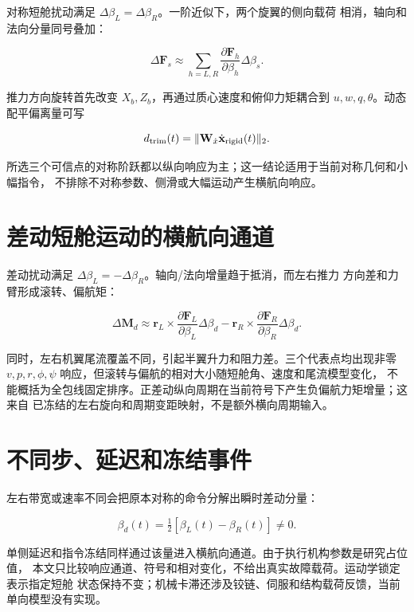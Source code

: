 \documentclass[UTF8,12pt,oneside,openany,fontset=windows]{ctexbook}
\begin{document}
对称短舱扰动满足 \(\Delta\beta_L=\Delta\beta_R\)。一阶近似下，两个旋翼的侧向载荷 相消，轴向和法向分量同号叠加：

\begin{equation}
\Delta\mathbf F_s\approx
\sum_{h=L,R}\frac{\partial\mathbf F_h}{\partial\beta_h}\Delta\beta_s .
\end{equation}

推力方向旋转首先改变 \(X_b,Z_b\)，再通过质心速度和俯仰力矩耦合到 \(u,w,q,\theta\)。动态配平偏离量可写

\begin{equation}
d_{\rm trim}(t)=
\|\mathbf W_{\dot x}\dot{\mathbf x}_{\rm rigid}(t)\|_2 .
\end{equation}

所选三个可信点的对称阶跃都以纵向响应为主；这一结论适用于当前对称几何和小幅指令， 不排除不对称参数、侧滑或大幅运动产生横航向响应。

\section{差动短舱运动的横航向通道}

差动扰动满足 \(\Delta\beta_L=-\Delta\beta_R\)。轴向/法向增量趋于抵消，而左右推力 方向差和力臂形成滚转、偏航矩：

\begin{equation}
\Delta\mathbf M_d\approx
\mathbf r_L\times\frac{\partial\mathbf F_L}{\partial\beta_L}\Delta\beta_d
-\mathbf r_R\times\frac{\partial\mathbf F_R}{\partial\beta_R}\Delta\beta_d .
\end{equation}

同时，左右机翼尾流覆盖不同，引起半翼升力和阻力差。三个代表点均出现非零 \(v,p,r,\phi,\psi\) 响应，但滚转与偏航的相对大小随短舱角、速度和尾流模型变化， 不能概括为全包线固定排序。正差动纵向周期在当前符号下产生负偏航力矩增量；这来自 已冻结的左右旋向和周期变距映射，不是额外横向周期输入。

\section{不同步、延迟和冻结事件}

左右带宽或速率不同会把原本对称的命令分解出瞬时差动分量：

\begin{equation}
\beta_d(t)=\tfrac12[\beta_L(t)-\beta_R(t)]\ne0.
\end{equation}

单侧延迟和指令冻结同样通过该量进入横航向通道。由于执行机构参数是研究占位值， 本文只比较响应通道、符号和相对变化，不给出真实故障载荷。运动学锁定表示指定短舱 状态保持不变；机械卡滞还涉及铰链、伺服和结构载荷反馈，当前单向模型没有实现。
\end{document}
